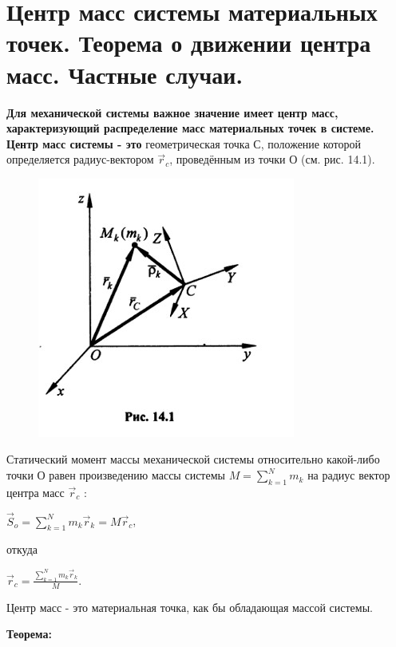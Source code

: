 {\section{Центр масс системы материальных точек. Теорема о движении центра масс. Частные случаи.}
\begin{center}
\par \textbf{Для механической системы важное значение имеет центр масс, характеризующий распределение масс материальных точек в системе. Центр масс системы - это}
геометрическая точка С, положение которой определяется радиус-вектором $\vec r_{c}$, проведённым из точки О (см. рис. 14.1).

\par \begin{figure}[H]
    \centering \includegraphics[scale = 0.7]{img/14.1.jpg}
    \end{figure}

\par Статический момент массы механической  системы  относительно  какой-либо точки О равен произведению массы системы $M = \sum\limits_{k=1}^N m_k$ на радиус вектор центра масс $\vec r_{c}$ :

\par $\vec S_o = \sum\limits_{k=1}^N m_k \vec r_k = M \vec r_c$,

\par откуда

\par $\vec r_c = \frac{\sum\limits_{k=1}^N m_k \vec r_k}{M}$.

\par Центр масс - это материальная точка, как бы обладающая массой системы.

\par\textbf{Теорема:}


\end{center}}
